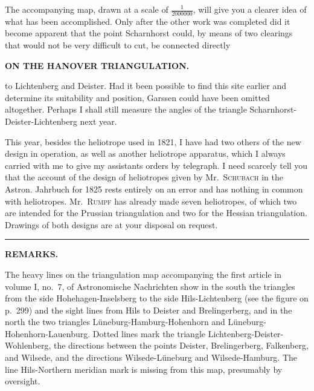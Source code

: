 \par\noindent\hspace*{\parindent}The accompanying map, drawn at a scale of \(\frac{1}{2000000}\), will give you a clearer idea of what has been accomplished. Only after the other work was completed did it become apparent that the point Scharnhorst could, by means of two clearings that would not be very difficult to cut, be connected directly

\par\clearpage
\noindent{}\hfill{\small\textbf{ON THE HANOVER TRIANGULATION.}}\hfill\null\par\medskip
\noindent to Lichtenberg and Deister. Had it been possible to find this site earlier and determine its suitability and position, Garssen could have been omitted altogether. Perhaps I shall still measure the angles of the triangle Scharnhorst-Deister-Lichtenberg next year.
\par\noindent\hspace*{\parindent}This year, besides the heliotrope used in 1821, I have had two others of the new design in operation, as well as another heliotrope apparatus, which I always carried with me to give my assistants orders by telegraph. I need scarcely tell you that the account of the design of heliotropes given by Mr.~\textsc{Schubach} in the Astron. Jahrbuch for 1825 rests entirely on an error and has nothing in common with  heliotropes. Mr.~\textsc{Rumpf} has already made seven heliotropes, of which two are intended for the Prussian triangulation and two for the Hessian triangulation. Drawings of both designs are at your disposal on request.
\begin{center}\rule{.12\linewidth}{.4pt}\end{center}
\begin{center}\textbf{REMARKS.}\end{center}
\begingroup\small
\par\noindent\hspace*{\parindent}The heavy lines on the triangulation map accompanying the first article in volume I, no.~7, of Astronomische Nachrichten show in the south the triangles from the side Hohehagen-Inselsberg to the side Hils-Lichtenberg (see the figure on p.~299) and the sight lines from Hils to Deister and Brelingerberg, and in the north the two triangles Lüneburg-Hamburg-Hohenhorn and Lüneburg-Hohenhorn-Lauenburg. Dotted lines mark the triangle Lichtenberg-Deister-Wohlenberg, the directions between the points Deister, Brelingerberg, Falkenberg, and Wilsede, and the directions Wilsede-Lüneburg and Wilsede-Hamburg. The line Hils-Northern meridian mark is missing from this map, presumably by oversight.
